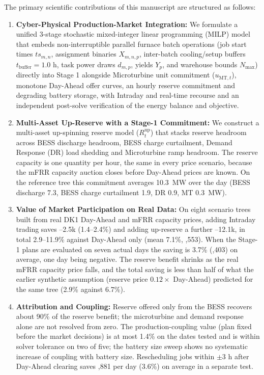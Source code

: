 \documentclass[journal]{IEEEtran}
\begin{document}
The primary scientific contributions of this manuscript are structured as follows:
\begin{enumerate}
    \item \textbf{Cyber-Physical Production-Market Integration:} We formulate a unified 3-stage stochastic mixed-integer linear programming (MILP) model that embeds non-interruptible parallel furnace batch operations (job start times $ts_{m,n}$, assignment binaries $X_{m,n,p}$, inter-batch cooling/setup buffers $t_{\text{buffer}}=1.0$ h, task power draws $d_{m,p}$, yields $Y_p$, and warehouse bounds $N_{\text{max}}$) directly into Stage 1 alongside Microturbine unit commitment ($u_{\text{MT},t}$), monotone Day-Ahead offer curves, an hourly reserve commitment and degrading battery storage, with Intraday and real-time recourse and an independent post-solve verification of the energy balance and objective.
    \item \textbf{Multi-Asset Up-Reserve with a Stage-1 Commitment:} We construct a multi-asset up-spinning reserve model ($R_{t}^{\text{up}}$) that stacks reserve headroom across BESS discharge headroom, BESS charge curtailment, Demand Response (DR) load shedding and Microturbine ramp headroom. The reserve capacity is one quantity per hour, the same in every price scenario, because the mFRR capacity auction closes before Day-Ahead prices are known. On the reference tree this commitment averages 10.3~MW over the day (BESS discharge 7.3, BESS charge curtailment 1.9, DR 0.9, MT 0.3~MW).
    \item \textbf{Value of Market Participation on Real Data:} On eight scenario trees built from real DK1 Day-Ahead and mFRR capacity prices, adding Intraday trading saves --2.5k (1.4--2.4\%) and adding up-reserve a further --12.1k, in total 2.9--11.9\% against Day-Ahead only (mean 7.1\%, ,553). When the Stage-1 plans are evaluated on seven actual days the saving is 3.7\% (,403) on average, one day being negative. The reserve benefit shrinks as the real mFRR capacity price falls, and the total saving is less than half of what the earlier synthetic assumption (reserve price $0.12\times$ Day-Ahead) predicted for the same tree (2.9\% against 6.7\%).
    \item \textbf{Attribution and Coupling:} Reserve offered only from the BESS recovers about 90\% of the reserve benefit; the microturbine and demand response alone are not resolved from zero. The production-coupling value (plan fixed before the market decisions) is at most 1.4\% on the dates tested and is within solver tolerance on two of five; the battery size sweep shows no systematic increase of coupling with battery size. Rescheduling jobs within $\pm3$ h after Day-Ahead clearing saves ,881 per day (3.6\%) on average in a separate test.
\end{enumerate}
\end{document}
